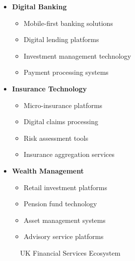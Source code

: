 \begin{tcolorbox}[colback=white,colframe=primarydark,title=\textbf{Financial Services Growth Areas}]
\begin{itemize}
    \item \textbf{Digital Banking}
    \begin{itemize}
        \item Mobile-first banking solutions
        \item Digital lending platforms
        \item Investment management technology
        \item Payment processing systems
    \end{itemize}

    \item \textbf{Insurance Technology}
    \begin{itemize}
        \item Micro-insurance platforms
        \item Digital claims processing
        \item Risk assessment tools
        \item Insurance aggregation services
    \end{itemize}

    \item \textbf{Wealth Management}
    \begin{itemize}
        \item Retail investment platforms
        \item Pension fund technology
        \item Asset management systems
        \item Advisory service platforms
    \end{itemize}
\end{itemize}
\end{tcolorbox}

\begin{figure}[htbp]
    \centering
    \caption{UK Financial Services Ecosystem}
    \label{fig:uk-financial-ecosystem}
\end{figure}


